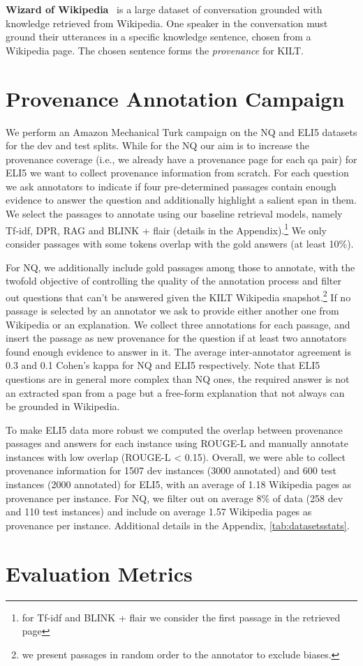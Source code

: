 \documentclass[11pt]{article}
\begin{document}
\textbf{Wizard of Wikipedia}~\cite{dinan2018wizard} is a large dataset of conversation grounded with knowledge retrieved from Wikipedia. One speaker in the conversation must ground their utterances in a specific knowledge sentence, chosen from a Wikipedia page. The chosen sentence forms the \emph{provenance} for KILT. 



 \section{Provenance Annotation Campaign}
\label{sec:annotation}

We perform an Amazon Mechanical Turk campaign on the NQ and ELI5 datasets for the dev and test splits. While for the NQ our aim is to increase the provenance coverage (i.e., we already have a provenance page for each qa pair) for ELI5 we want to collect provenance information from scratch. For each question we ask annotators to indicate if four pre-determined passages contain enough evidence to answer the question and additionally highlight a salient span in them. We select the passages to annotate using our baseline retrieval models, namely Tf-idf, DPR, RAG and BLINK + flair (details in the Appendix).\footnote{for Tf-idf and BLINK + flair we consider the first passage in the retrieved page} We only consider passages with some tokens overlap with the gold answers (at least 10\%).

For NQ, we additionally include gold passages among those to annotate, with the twofold objective of controlling the quality of the annotation process and filter out questions that can't be answered given the KILT Wikipedia snapshot.\footnote{we present passages in random order to the annotator to exclude biases.} If no passage is selected by an annotator we ask to provide either another one from Wikipedia or an explanation. We collect three annotations for each passage, and insert the passage as new provenance for the question if at least two annotators found enough evidence to answer in it.   
The average inter-annotator agreement is 0.3 and 0.1 Cohen's kappa for NQ and ELI5 respectively. Note that ELI5 questions are in general more complex than NQ ones, the required answer is not an extracted span from a page but a free-form explanation that not always can be grounded in Wikipedia. 

To make ELI5 data more robust we computed the overlap between provenance passages and answers for each instance using ROUGE-L and manually annotate instances with low overlap (ROUGE-L < 0.15). Overall, we were able to collect provenance information for 1507 dev instances (3000 annotated) and 600 test instances (2000 annotated) for ELI5, with an average of 1.18 Wikipedia pages as provenance per instance. For NQ, we filter out on average 8\% of data (258 dev and 110 test instances) and include on average 1.57 Wikipedia pages as provenance per instance. Additional details in the Appendix, \cref{tab:datasetsstats}. \section{Evaluation Metrics}
\end{document}

